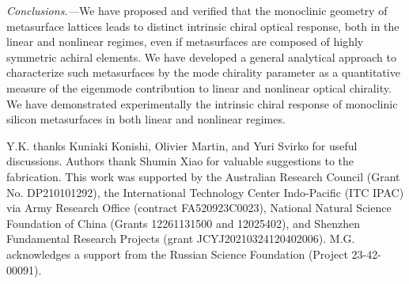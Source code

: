 \documentclass[
    reprint,
    superscriptaddress,
    a4paper,
    amsmath,amssymb,
    prl,
]{revtex4-2}
\begin{document}
\textit{Conclusions.---}We have proposed and verified that the monoclinic geometry of metasurface lattices leads to distinct intrinsic chiral optical response, both in the linear and nonlinear regimes, even if metasurfaces are composed of highly symmetric achiral elements. We have developed a general analytical approach to characterize such metasurfaces by the mode chirality parameter as a quantitative measure of the eigenmode contribution to linear and nonlinear optical chirality. We have demonstrated experimentally the intrinsic chiral response of monoclinic silicon metasurfaces in both linear and nonlinear regimes.



\begin{acknowledgements}
Y.K. thanks Kuniaki Konishi, Olivier Martin, and Yuri Svirko for useful discussions.  
Authors thank Shumin Xiao for valuable suggestions to the fabrication.
This work was supported by the Australian Research Council (Grant No. DP210101292), the International Technology Center Indo-Pacific (ITC IPAC) via Army Research Office (contract FA520923C0023), National Natural Science Foundation of China (Grants 12261131500 and 12025402), and Shenzhen Fundamental Research Projects (grant JCYJ20210324120402006). M.G. acknowledges a support from the Russian Science Foundation (Project 23-42-00091).
\end{acknowledgements}




 



\end{document}
